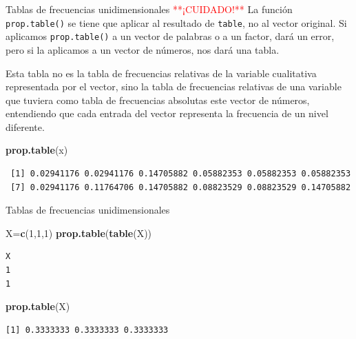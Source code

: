 \documentclass[
  ignorenonframetext,
]{beamer}
\newenvironment{Shaded}{\begin{snugshade}}{\end{snugshade}}
\newcommand{\DecValTok}[1]{\textcolor[rgb]{0.00,0.00,0.81}{#1}}
\newcommand{\FunctionTok}[1]{\textcolor[rgb]{0.13,0.29,0.53}{\textbf{#1}}}
\newcommand{\NormalTok}[1]{#1}
\newcommand{\OtherTok}[1]{\textcolor[rgb]{0.56,0.35,0.01}{#1}}
\newcommand\red[1]{\textcolor{red}{#1}}
\begin{document}
\begin{frame}[fragile]{Tablas de frecuencias unidimensionales}
\label{tablas-de-frecuencias-unidimensionales-9}
\red{**¡CUIDADO!**} La función \texttt{prop.table()} se tiene que
aplicar al resultado de \texttt{table}, no al vector original. Si
aplicamos \texttt{prop.table()} a un vector de palabras o a un factor,
dará un error, pero si la aplicamos a un vector de números, nos dará una
tabla.

Esta tabla no es la tabla de frecuencias relativas de la variable
cualitativa representada por el vector, sino la tabla de frecuencias
relativas de una variable que tuviera como tabla de frecuencias
absolutas este vector de números, entendiendo que cada entrada del
vector representa la frecuencia de un nivel diferente.

\begin{Shaded}
\begin{Highlighting}[]
\FunctionTok{prop.table}\NormalTok{(x)}
\end{Highlighting}
\end{Shaded}

\begin{verbatim}
 [1] 0.02941176 0.02941176 0.14705882 0.05882353 0.05882353 0.05882353
 [7] 0.02941176 0.11764706 0.14705882 0.08823529 0.08823529 0.14705882
\end{verbatim}
\end{frame}

\begin{frame}[fragile]{Tablas de frecuencias unidimensionales}
\label{tablas-de-frecuencias-unidimensionales-10}
\begin{Shaded}
\begin{Highlighting}[]
\NormalTok{X}\OtherTok{=}\FunctionTok{c}\NormalTok{(}\DecValTok{1}\NormalTok{,}\DecValTok{1}\NormalTok{,}\DecValTok{1}\NormalTok{)}
\FunctionTok{prop.table}\NormalTok{(}\FunctionTok{table}\NormalTok{(X))}
\end{Highlighting}
\end{Shaded}

\begin{verbatim}
X
1 
1 
\end{verbatim}

\begin{Shaded}
\begin{Highlighting}[]
\FunctionTok{prop.table}\NormalTok{(X)}
\end{Highlighting}
\end{Shaded}

\begin{verbatim}
[1] 0.3333333 0.3333333 0.3333333
\end{verbatim}
\end{frame}
\end{document}
